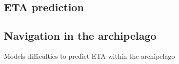 \documentclass[../main.tex]{subfiles}
\begin{document}
\subsection{ETA prediction}

\subsection{Navigation in the archipelago}

Models difficulties to predict ETA within the archipelago
\end{document}
